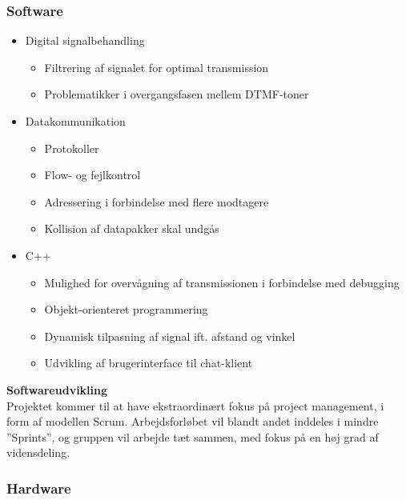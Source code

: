 \subsubsection{Software}

\begin{itemize}[noitemsep]
  \item Digital signalbehandling
  \begin{itemize}[noitemsep]
    \item Filtrering af signalet for optimal transmission
    \item Problematikker i overgangsfasen mellem DTMF-toner
  \end{itemize}
  \item Datakommunikation
  \begin{itemize}[noitemsep]
    \item Protokoller
    \item Flow- og fejlkontrol
    \item Adressering i forbindelse med flere modtagere
    \item Kollision af datapakker skal undgås
  \end{itemize}
  \item C++
    \begin{itemize}[noitemsep]
    \item Mulighed for overvågning af transmissionen i forbindelse med debugging
    \item Objekt-orienteret programmering
    \item Dynamisk tilpasning af signal ift. afstand og vinkel
    \item Udvikling af brugerinterface til chat-klient
  \end{itemize}
\end{itemize}

\textbf{Softwareudvikling}\\
Projektet kommer til at have ekstraordinært fokus på project management, i form af modellen Scrum. Arbejdsforløbet vil blandt andet inddeles i mindre ”Sprints”, og gruppen vil arbejde tæt sammen, med fokus på en høj grad af vidensdeling.

\subsubsection{Hardware}

